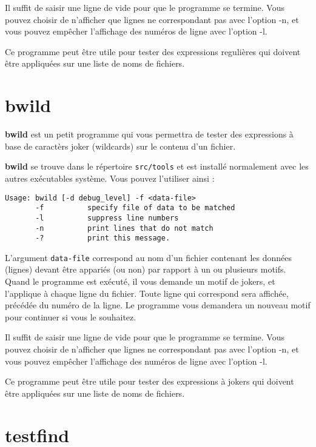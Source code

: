 Il suffit de saisir une ligne de vide pour que le programme se termine. Vous
pouvez choisir de n'afficher que lignes ne correspondant pas avec l'option -n, 
et vous pouvez empêcher l'affichage des numéros de ligne avec l'option -l.

Ce programme peut être utile pour tester des expressions regulières qui doivent
être appliquées sur une liste de noms de fichiers.

\section{bwild}
\label{bwild}

{\bf bwild} est un petit programme qui vous permettra de tester des expressions
à base de caractèrs joker (wildcards) sur le contenu d'un fichier.

{\bf bwild} se trouve dans le répertoire \texttt{src/tools} et est installé 
normalement avec les autres exécutables système. Vous pouvez l'utiliser ainsi :


\begin{verbatim}
Usage: bwild [-d debug_level] -f <data-file>
       -f          specify file of data to be matched
       -l          suppress line numbers
       -n          print lines that do not match
       -?          print this message.
\end{verbatim}

L'argument \texttt{\lt{}data-file\gt{}} correspond au nom d'un fichier contenant
les données (lignes) devant être appariés (ou non) par rapport à un ou plusieurs
motifs. Quand le programme est exécuté, il vous demande un motif de jokers, 
et l'applique à chaque ligne du fichier. Toute ligne qui correspond
sera affichée, précédée du numéro de la ligne. Le programme vous demandera un
nouveau motif pour continuer si vous le souhaitez.

Il suffit de saisir une ligne de vide pour que le programme se termine. Vous
pouvez choisir de n'afficher que lignes ne correspondant pas avec l'option -n, 
et vous pouvez empêcher l'affichage des numéros de ligne avec l'option -l.

Ce programme peut être utile pour tester des expressions à jokers qui doivent
être appliquées sur une liste de noms de fichiers.

\section{testfind}
\label{testfind}

